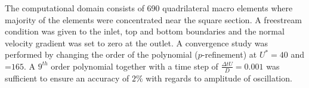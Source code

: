  The computational domain consists of 690 quadrilateral macro elements where majority of the elements were concentrated near the square section. A freestream condition was given to the inlet, top and bottom boundaries and the normal velocity gradient was set to zero at the outlet. A convergence study was performed by changing the order of the polynomial ($p$-refinement) at $U^*=40$ and \reynoldsnumber=$165$. A $9^{th}$ order polynomial together with a time step of $\frac{\Delta tU}{D}=0.001$ was sufficient to ensure an accuracy of $2\%$ with regards to amplitude of oscillation.
